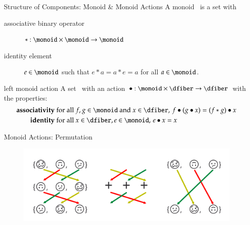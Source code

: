 \documentclass[xcolor={dvipsnames}, handout]{beamer}
\begin{document}
\begin{frame}{Structure of Components: Monoid \& Monoid Actions}
A monoid \monoid\ is a set with
\begin{description}
    \item[associative binary operator] $\ast:\monoid \times \monoid\rightarrow \monoid$
    \item[identity element] $e\in \monoid$ such that $e\ast a= a \ast e = a$ for all $a \in \monoid$. 
\end{description}
\pause
\begin{block}{left monoid action}
A set \dfiber\ with an action\cite{nlab:action} $\bullet: \monoid\times \dfiber \rightarrow \dfiber$ with the properties:
    \begin{align*}
        \textbf{associativity}\;& \text{for all } f,g \in \monoid \text{ and } x\in \dfiber,\, f\bullet(g\bullet x) = (f\ast g) \bullet x\\
        \textbf{identity}\;& \text{for all } x\in \dfiber, e\in \monoid,\,  e\bullet x = x 
    \end{align*}
\end{block}
\end{frame}

\begin{frame}{Monoid Actions: Permutation}
    \begin{figure}
        \includegraphics[width=1\linewidth]{figures/math/monoid_emoji.png}
    \end{figure}
\end{frame}
\end{document}
